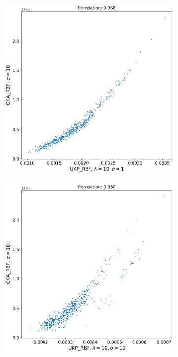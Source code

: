 \documentclass{article}
\theoremstyle{plain}
\begin{document}
\begin{figure}[h!]
    \vspace{0.5cm}  %
    
    \begin{subfigure}[b]{0.45\textwidth}
        \includegraphics[width=\textwidth]{Appendix figures/imagenet_experiments/Correlation final/Correlation plot for CKA_dist_RBF_1.000000e+01 and UKP_dist_RBF_1.000000e+01_1.000000e+00.png}
    \end{subfigure}
    \hfill
    \begin{subfigure}[b]{0.45\textwidth}
        \includegraphics[width=\textwidth]{Appendix figures/imagenet_experiments/Correlation final/Correlation plot for CKA_dist_RBF_1.000000e+01 and UKP_dist_RBF_1.000000e+01_1.000000e+01.png}
    \end{subfigure}
    

\end{figure}
\end{document}
